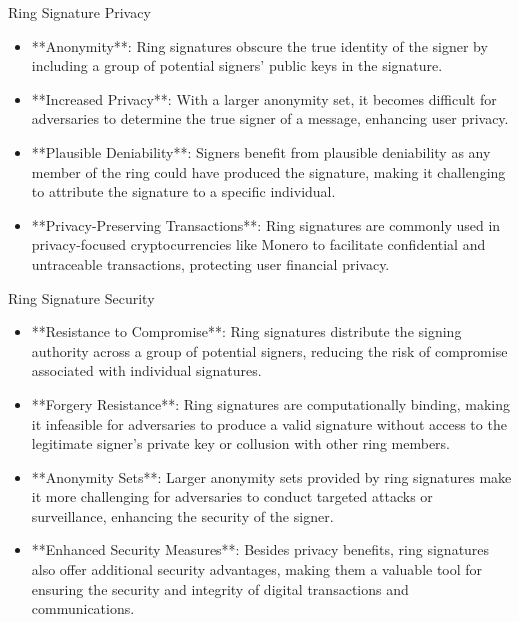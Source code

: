 \begin{frame}{Ring Signature Privacy}
    \begin{itemize}
        \item **Anonymity**: Ring signatures obscure the true identity of the signer by including a group of potential signers' public keys in the signature.
        \item **Increased Privacy**: With a larger anonymity set, it becomes difficult for adversaries to determine the true signer of a message, enhancing user privacy.
        \item **Plausible Deniability**: Signers benefit from plausible deniability as any member of the ring could have produced the signature, making it challenging to attribute the signature to a specific individual.
        \item **Privacy-Preserving Transactions**: Ring signatures are commonly used in privacy-focused cryptocurrencies like Monero to facilitate confidential and untraceable transactions, protecting user financial privacy.
    \end{itemize}
\end{frame}

\begin{frame}{Ring Signature Security}
    \begin{itemize}
        \item **Resistance to Compromise**: Ring signatures distribute the signing authority across a group of potential signers, reducing the risk of compromise associated with individual signatures.
        \item **Forgery Resistance**: Ring signatures are computationally binding, making it infeasible for adversaries to produce a valid signature without access to the legitimate signer's private key or collusion with other ring members.
        \item **Anonymity Sets**: Larger anonymity sets provided by ring signatures make it more challenging for adversaries to conduct targeted attacks or surveillance, enhancing the security of the signer.
        \item **Enhanced Security Measures**: Besides privacy benefits, ring signatures also offer additional security advantages, making them a valuable tool for ensuring the security and integrity of digital transactions and communications.
    \end{itemize}
\end{frame}


